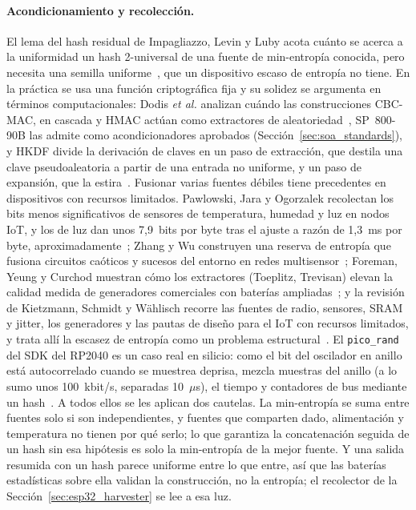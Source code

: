 \paragraph{Acondicionamiento y recolección.} El lema del hash residual de
Impagliazzo, Levin y Luby acota cuánto se acerca a la uniformidad un hash
2-universal de una fuente de min-entropía conocida, pero necesita una
semilla uniforme~\cite{impagliazzo_1989_pseudorandom}, que un dispositivo
escaso de entropía no tiene. En la práctica se usa una función
criptográfica fija y su solidez se argumenta en términos computacionales:
Dodis \emph{et al.} analizan cuándo las construcciones CBC-MAC, en cascada
y HMAC actúan como extractores de aleatoriedad~\cite{dodis_2004_randomness},
SP~800-90B las admite como acondicionadores aprobados
(Sección~\ref{sec:soa_standards}), y HKDF divide la derivación de claves
en un paso de extracción, que destila una clave pseudoaleatoria a partir
de una entrada no uniforme, y un paso de expansión, que la
estira~\cite{krawczyk_2010_hkdf}. Fusionar varias fuentes débiles tiene
precedentes en dispositivos con recursos limitados. Pawlowski, Jara y
Ogorzalek recolectan los bits menos significativos de sensores de
temperatura, humedad y luz en nodos IoT, y los de luz dan unos
7,9~bits por byte tras el ajuste a razón de 1,3~ms por byte,
aproximadamente~\cite{pawlowski_2015_harvesting}; Zhang y Wu construyen
una reserva de entropía que fusiona circuitos caóticos y sucesos del
entorno en redes multisensor~\cite{zhang_2023_heterogeneous}; Foreman,
Yeung y Curchod muestran cómo los extractores (Toeplitz, Trevisan) elevan
la calidad medida de generadores comerciales con baterías
ampliadas~\cite{foreman_2024_statistical}; y la revisión de Kietzmann,
Schmidt y W\"ahlisch recorre las fuentes de radio, sensores, SRAM y
jitter, los generadores y las pautas de diseño para el IoT con recursos
limitados, y trata allí la escasez de entropía como un problema
estructural~\cite{kietzmann_2021_guideline}. El \texttt{pico\_\allowbreak{}rand} del
SDK del RP2040 es un caso real en silicio: como el bit del oscilador en
anillo está autocorrelado cuando se muestrea deprisa, mezcla muestras del
anillo (a lo sumo unos 100~kbit/s, separadas 10~$\mu$s), el tiempo y
contadores de bus mediante un hash~\cite{rpi_forum_picorand}. A todos
ellos se les aplican dos cautelas. La min-entropía se suma entre fuentes
solo si son independientes, y fuentes que comparten dado, alimentación y
temperatura no tienen por qué serlo; lo que garantiza la concatenación
seguida de un hash sin esa hipótesis es solo la min-entropía de la mejor
fuente. Y una salida resumida con un hash parece uniforme entre lo que
entre, así que las baterías estadísticas sobre ella validan la
construcción, no la entropía; el recolector de la
Sección~\ref{sec:esp32_harvester} se lee a esa luz.

